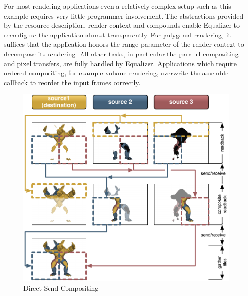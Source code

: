 For most rendering applications even a relatively complex setup such as this
example requires very little programmer involvement. The abstractions provided
by the resource description, render context and compounds enable Equalizer to
reconfigure the application almost transparently. For polygonal rendering, it
suffices that the application honors the \textsf{range} parameter of the render
context to decompose its rendering. All other tasks, in particular the parallel
compositing and pixel transfers, are fully handled by Equalizer. Applications
which require ordered compositing, for example volume rendering, overwrite the
assemble callback to reorder the input frames correctly.

\begin{figure}[h!t]
  \includegraphics[width=\textwidth]{images/directSend}
  {\caption{\label{fDirectSend}Direct Send Compositing}}
\end{figure}

